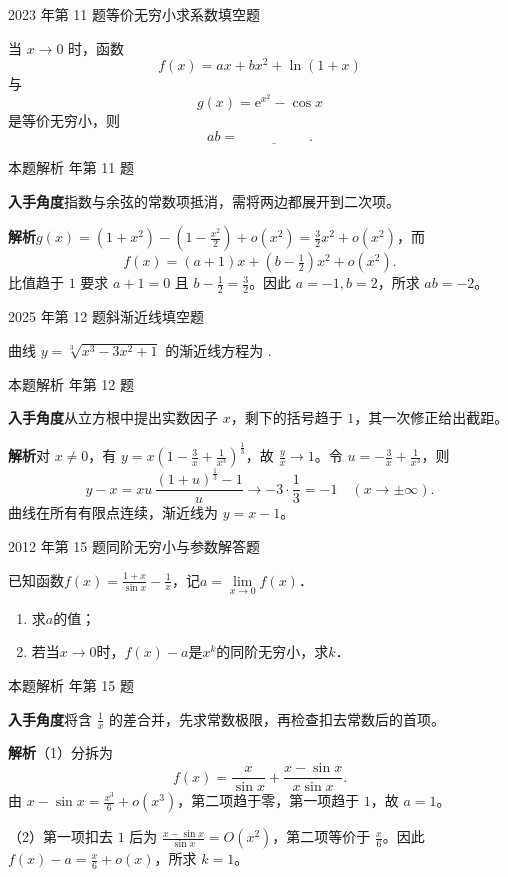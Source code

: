 \documentclass[UTF8,zihao=-4,fontset=fandol]{ctexart}
\renewcommand{\lim}{\operatorname*{lim}\limits}
\newcommand{\blank}{\underline{\hspace{5em}}}
\newcommand{\QuestionPage}[6]{%
  \par\noindent\begin{minipage}{\linewidth}
  \raggedright
  {\small\textcolor{black!60}{#3\quad #5}\hfill\textcolor{accent}{#2}}\par\smallskip}
\newcommand{\QuestionEnd}{\end{minipage}\par\medskip}
\newcommand{\QuestionPage}[6]{%
  \clearpage
  {\small\textcolor{accent}{#1\hfill #2}}\par\medskip
  {\small\textcolor{black!60}{#3\quad #5\hfill #6}}\par\vspace{9bp}}
\newcommand{\QuestionEnd}{}
\newenvironment{QuestionSolution}[1]{%
  \clearpage
  {\small\textcolor{black!60}{本题解析\quad #1}}\par\medskip
}{\par\clearpage}
\begin{document}
\QuestionPage{1.4 无穷小量与无穷大量}{填空题}{2023 年第 11 题}{2}{等价无穷小求系数}{034 / 234}
当 \(x\to 0\) 时，函数
\[f(x)=ax+bx^2+\ln(1+x)
\]
与
\[g(x)=\mathrm{e}^{x^2}-\cos x
\]
是等价无穷小，则
\[ab=\blank{}.
\]
\QuestionEnd

\begin{QuestionSolution}{2023 年第 11 题}
\textbf{入手角度}\quad 指数与余弦的常数项抵消，需将两边都展开到二次项。

\textbf{解析}\quad \(g(x)=(1+x^2)-(1-\frac{x^2}{2})+o(x^2)=\tfrac32x^2+o(x^2)\)，而
\[
f(x)=(a+1)x+(b-\tfrac12)x^2+o(x^2).
\]
比值趋于 \(1\) 要求 \(a+1=0\) 且 \(b-\tfrac12=\tfrac32\)。因此 \(a=-1,b=2\)，所求 \(ab=\boxed{-2}\)。
\end{QuestionSolution}

\QuestionPage{1.4 无穷小量与无穷大量}{填空题}{2025 年第 12 题}{2}{斜渐近线}{035 / 234}
曲线 \(y = \sqrt[3]{x^{3} - 3x^{2} + 1}\) 的渐近线方程为 \blank{}.
\QuestionEnd

\begin{QuestionSolution}{2025 年第 12 题}
\textbf{入手角度}\quad 从立方根中提出实数因子 \(x\)，剩下的括号趋于 \(1\)，其一次修正给出截距。

\textbf{解析}\quad 对 \(x\ne0\)，有 \(y=x(1-\frac{3}{x}+\frac{1}{x^3})^{\frac{1}{3}}\)，故 \(\frac{y}{x}\to1\)。令 \(u=-\frac{3}{x}+\frac{1}{x^3}\)，则
\[
y-x=xu\,\frac{(1+u)^{\frac{1}{3}}-1}{u}\longrightarrow-3\cdot\frac13=-1
\quad(x\to\pm\infty).
\]
曲线在所有有限点连续，渐近线为 \(\boxed{y=x-1}\)。
\end{QuestionSolution}

\QuestionPage{1.4 无穷小量与无穷大量}{解答题}{2012 年第 15 题}{2}{同阶无穷小与参数}{036 / 234}
已知函数$f(x) = \frac{1 + x}{\sin x} - \frac{1}{x}$，记$a = \lim_{x \to 0} f(x)$．\par
\begin{enumerate}
\item 求$a$的值；
\item 若当$x \to 0$时，$f(x) - a$是$x^k$的同阶无穷小，求$k$．
\end{enumerate}
\QuestionEnd

\begin{QuestionSolution}{2012 年第 15 题}
\textbf{入手角度}\quad 将含 \(\frac{1}{x}\) 的差合并，先求常数极限，再检查扣去常数后的首项。

\textbf{解析}\quad （1）分拆为
\[
f(x)=\frac{x}{\sin x}+\frac{x-\sin x}{x\sin x}.
\]
由 \(x-\sin x=\frac{x^3}{6}+o(x^3)\)，第二项趋于零，第一项趋于 \(1\)，故 \(a=1\)。

（2）第一项扣去 \(1\) 后为 \(\frac{x-\sin x}{\sin x}=O(x^2)\)，第二项等价于 \(\frac{x}{6}\)。因此 \(f(x)-a=\frac{x}{6}+o(x)\)，所求 \(k=\boxed{1}\)。
\end{QuestionSolution}
\end{document}
